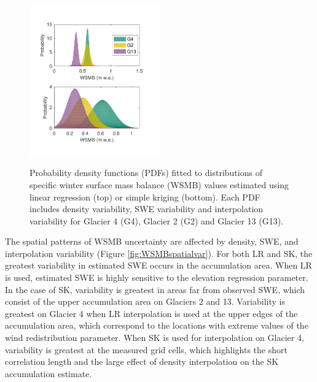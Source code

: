 \documentclass[review,oneside, letterpaper]{igs}
\begin{document}
\begin{figure}
	\centering
	\includegraphics[width =0.5\textwidth]{WSMBDist_full.pdf}\\
	\caption{Probability density functions (PDFs) fitted to distributions of specific winter surface mass balance (WSMB) values estimated using linear regression (top) or simple kriging (bottom). Each PDF includes density variability, SWE variability and interpolation variability for Glacier 4 (G4), Glacier 2 (G2) and Glacier 13 (G13).}
	\label{fig:WSMBDist_LRvsSK}
\end{figure}


The spatial patterns of WSMB uncertainty are affected by density, SWE, and interpolation variability (Figure \ref{fig:WSMBspatialvar}).  For both LR and SK, the greatest variability in estimated SWE occurs in the accumulation area. When LR is used, estimated SWE is highly sensitive to the elevation regression parameter. In the case of SK, variability is greatest in areas far from observed SWE, which consist of the upper accumulation area on Glaciers 2 and 13. Variability is greatest on Glacier 4 when LR interpolation is used at the upper edges of the accumulation area, which correspond to the locations with extreme values of the wind redistribution parameter. When SK is used for interpolation on Glacier 4, variability is greatest at the measured grid cells, which highlights the short correlation length and the large effect of density interpolation on the SK accumulation estimate.
\end{document}
